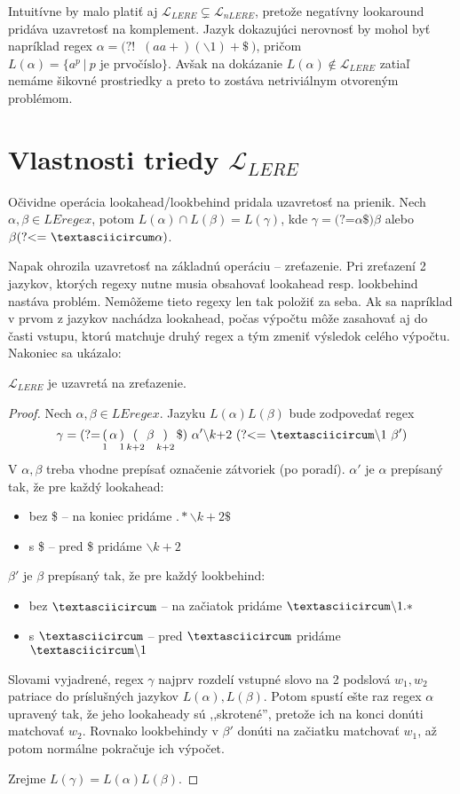 \documentclass{svk_long_sk}
\def\le{LEregex}
\def\lel{\mathscr{L}_{LERE}}
\def\nlel{\mathscr{L}_{nLERE}}
\def\lookahead{\text{(?=}}
\def\nlookahead{\text{(?!~}}
\def\lookbehind{\text{(?\textless =}}
\begin{document}
Intuitívne by malo platiť aj $\lel \subsetneq \nlel$, pretože negatívny lookaround pridáva uzavretosť na komplement. Jazyk dokazujúci nerovnosť by mohol byť napríklad regex $\alpha =\nlookahead ~(aa+)(\backslash 1)+ \$~)$, pričom $L(\alpha)= \lbrace a^p ~|~ p \text{ je prvočíslo} \rbrace$. Avšak na dokázanie $L(\alpha)\notin\lel$ zatiaľ nemáme šikovné prostriedky a preto to zostáva netriviálnym otvoreným problémom.

\section{Vlastnosti triedy $\lel$}

Očividne operácia lookahead/lookbehind pridala uzavretosť na prienik. Nech $\alpha,\beta\in\le$, potom $L(\alpha)\cap L(\beta) = L(\gamma)$, kde $\gamma = \lookahead \alpha \$)\beta$ alebo $\beta \lookbehind ~\textasciicircum \alpha)$.

Napak ohrozila uzavretosť na základnú operáciu -- zreťazenie. Pri zreťazení 2 jazykov, ktorých regexy nutne musia obsahovať lookahead resp. lookbehind nastáva problém. Nemôžeme tieto regexy len tak položiť za seba. Ak sa napríklad v prvom z jazykov nachádza lookahead, počas výpočtu môže zasahovať aj do časti vstupu, ktorú matchuje druhý regex a tým zmeniť výsledok celého výpočtu. Nakoniec sa ukázalo:
\begin{theorem}
$\lel$ je uzavretá na zreťazenie.
\end{theorem}
\begin{proof}
Nech $\alpha,\beta\in\le$. Jazyku $L(\alpha)L(\beta)$ bude zodpovedať regex
$$
\gamma = \lookahead \mathop(_1 \alpha \mathop)_1 \mathop(_{k+2}\beta \mathop)_{k+2} \mathdollar) ~\alpha ' \backslash k\text{+2}~ \lookbehind ~\textasciicircum\backslash 1~\beta ')
$$
V $\alpha,\beta$ treba vhodne prepísať označenie zátvoriek (po poradí). $\alpha '$ je $\alpha$ prepísaný tak, že pre každý lookahead:
\begin{itemize}
\item bez \$ -- na koniec pridáme $.* \backslash k+2 \mathdollar $
\item s \$ -- pred \$ pridáme $\backslash k+2$
\end{itemize}
$\beta '$ je $\beta$ prepísaný tak, že pre každý lookbehind:
\begin{itemize}
\item bez $\textasciicircum$ -- na začiatok pridáme $\textasciicircum \backslash 1.*$
\item s $\textasciicircum$ -- pred $\textasciicircum$ pridáme $\textasciicircum \backslash 1$
\end{itemize}

Slovami vyjadrené, regex $\gamma$ najprv rozdelí vstupné slovo na 2 podslová $w_1,w_2$ patriace do príslušných jazykov $L(\alpha), L(\beta)$. Potom spustí ešte raz regex $\alpha$ upravený tak, že jeho lookaheady sú ,,skrotené'', pretože ich na konci donúti matchovať $w_2$. Rovnako lookbehindy v $\beta'$ donúti na začiatku matchovať $w_1$, až potom normálne pokračuje ich výpočet.

Zrejme $L(\gamma)=L(\alpha)L(\beta)$.
\end{proof}
\end{document}
